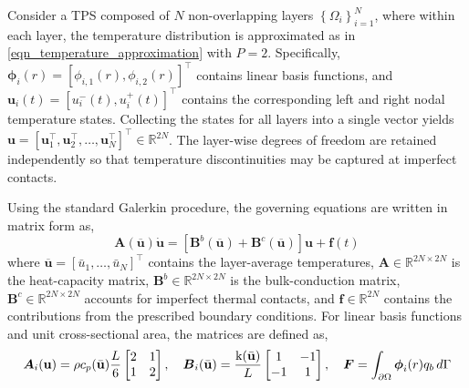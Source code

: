Consider a TPS composed of $N$ non-overlapping layers $\left\{\Omega_i\right\}_{i=1}^{N}$, where within each layer, the temperature distribution is approximated as in \cref{eqn_temperature_approximation} with $P=2$. Specifically, $\boldsymbol{\phi}_i(r) = \left[\phi_{i,1}(r),\phi_{i,2}(r)\right]^\top$ contains linear basis functions, and $\boldsymbol{u}_i(t) = \left[u_{i}^{-}(t),u_{i}^{+}(t)\right]^\top$ contains the corresponding left and right nodal temperature states. Collecting the states for all layers into a single vector yields $\boldsymbol{u} = \left[\boldsymbol{u}_1^\top,\boldsymbol{u}_2^\top,\dots,\boldsymbol{u}_N^\top\right]^\top\in\mathbb{R}^{2N}$. The layer-wise degrees of freedom are retained independently so that temperature discontinuities may be captured at imperfect contacts.

Using the standard Galerkin procedure, the governing equations are written in matrix form as,
\begin{equation}
    \boldsymbol{A}\left(\overline{\boldsymbol{u}}\right)\dot{\boldsymbol{u}} = \left[\boldsymbol{B}^{b}\left(\overline{\boldsymbol{u}}\right) + \boldsymbol{B}^{c}\left(\overline{\boldsymbol{u}}\right)\right]\boldsymbol{u} + \boldsymbol{f}(t)
\end{equation}
where $\overline{\boldsymbol{u}}=[\bar{u}_1,\ldots,\bar{u}_N]^{\top}$ contains the layer-average temperatures, $\boldsymbol{A}\in\mathbb{R}^{2N\times2N}$ is the heat-capacity matrix, $\boldsymbol{B}^{b}\in\mathbb{R}^{2N\times2N}$ is the bulk-conduction matrix, $\boldsymbol{B}^{c}\in\mathbb{R}^{2N\times2N}$  accounts for imperfect thermal contacts, and $\boldsymbol{f}\in\mathbb{R}^{2N}$ contains the contributions from the prescribed boundary conditions. For linear basis functions and unit cross-sectional area, the matrices are defined as,
\begin{equation}
    \boldsymbol{A}_i(\mathbf{u}) = \rho c_p(\bar{\mathbf{u}})\frac L6 \begin{bmatrix} 2 & 1 \\ 1 & 2 \\ \end{bmatrix},\quad \boldsymbol{B}_i(\bar{\mathbf{u}}) = \frac{\text{k}(\bar{\mathbf{u}})}{L} \begin{bmatrix} 1 & -1 \\ -1 & 1 \end{bmatrix},\quad \boldsymbol{F} = \int_{\partial\Omega} \boldsymbol{\phi}_i(r) q_b \, d\Gamma
\end{equation}

